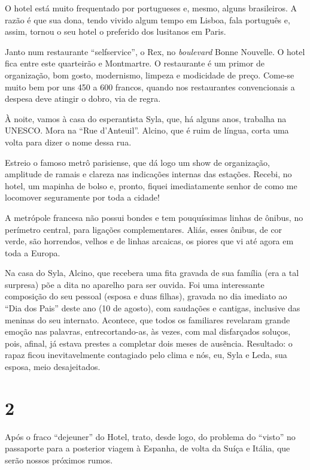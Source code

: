 O hotel está muito frequentado por portugueses e, mesmo, alguns brasileiros. A razão é que sua dona, tendo vivido algum tempo em Lisboa, fala português e, assim, tornou o seu hotel o preferido dos lusitanos em Paris.

Janto num restaurante ``selfservice'', o Rex, no \textit{boulevard} Bonne Nouvelle. O hotel fica entre este quarteirão e Montmartre. O restaurante é um primor de organização, bom gosto, modernismo, limpeza e modicidade de preço. Come-se muito bem por uns 450 a 600 francos, quando nos restaurantes convencionais a despesa deve atingir o dobro, via de regra.

À noite, vamos à casa do esperantista Syla, que, há alguns anos, trabalha na UNESCO. Mora na ``Rue d’Anteuil''. Alcino, que é ruim de língua, corta uma volta para dizer o nome dessa rua.

Estreio o famoso metrô parisiense, que dá logo um show de organização, amplitude de ramais e clareza nas indicações internas das estações. Recebi, no hotel, um mapinha de bolso e, pronto, fiquei imediatamente senhor de como me locomover seguramente por toda a cidade!

A metrópole francesa não possui bondes e tem pouquíssimas linhas de ônibus, no perímetro central, para ligações complementares. Aliás, esses ônibus, de cor verde, são horrendos, velhos e de linhas arcaicas, os piores que vi até agora em toda a Europa.

Na casa do Syla, Alcino, que recebera uma fita gravada de sua família (era a tal surpresa) põe a dita no aparelho para ser ouvida. Foi uma interessante composição do seu pessoal (esposa e duas filhas), gravada no dia imediato ao ``Dia dos Pais'' deste ano (10 de agosto), com saudações e cantigas, inclusive das meninas do seu internato. Acontece, que todos os familiares revelaram grande emoção nas palavras, entrecortando-as, às vezes, com mal disfarçados soluços, pois, afinal, já estava prestes a completar dois meses de ausência. Resultado: o rapaz ficou inevitavelmente contagiado pelo clima e nós, eu, Syla e Leda, sua esposa, meio desajeitados.

\section*{2 \adfflatleafright {}}
Após o fraco ``dejeuner'' do Hotel, trato, desde logo, do problema do ``visto'' no passaporte para a posterior viagem à Espanha, de volta da Suíça e Itália, que serão nossos próximos rumos.

